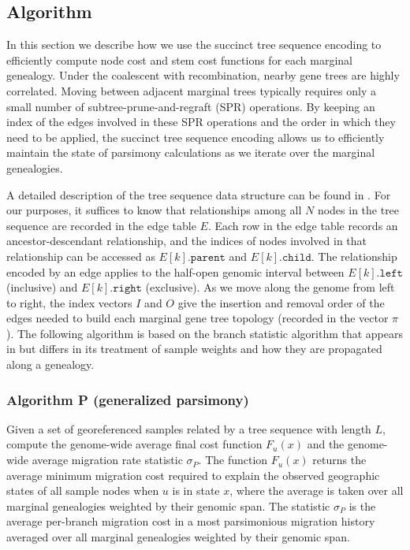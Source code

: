 
\subsection{Algorithm}

In this section we describe how we use the succinct tree sequence encoding
\citep{Kelleher_etal_2016} to efficiently compute node cost and stem cost 
functions for each marginal genealogy. Under the coalescent with recombination, 
nearby gene trees are highly correlated. Moving between adjacent marginal trees 
typically requires only a small number of subtree-prune-and-regraft (SPR) 
operations. By keeping an index of the edges involved in these SPR operations 
and the order in which they need to be applied, the succinct tree sequence 
encoding allows us to efficiently maintain the state of parsimony calculations 
as we iterate over the marginal genealogies.

A detailed description of the tree sequence data structure can be found in
\citet{Kelleher_etal_2016}. For our purposes, it suffices to know that
relationships among all $N$ nodes in the tree sequence are recorded in the edge 
table $E$. Each row in the edge table records an ancestor-descendant
relationship, and the indices of nodes involved in that relationship can be 
accessed as $E[k].\texttt{parent}$ and  $E[k].\texttt{child}$. The relationship 
encoded by an edge applies to the half-open genomic interval between $E[k].\texttt{left}$ 
(inclusive) and $E[k].\texttt{right}$ (exclusive). As we move along the genome 
from left to right, the index vectors $I$ and $O$ give the insertion and
removal order of the edges needed to build each marginal gene tree topology 
(recorded in the vector $\pi$). The following algorithm is based on
the branch statistic algorithm that appears in \citet{Ralph_etal_2020} but
differs in its treatment of sample weights and how they are propagated along
a genealogy.

\subsubsection*{Algorithm P (generalized parsimony)}

Given a set of georeferenced samples related by a tree sequence with length
$L$, compute the genome-wide average final cost function $F_u(x)$ and the
genome-wide average migration rate statistic $\sigma_P$. The function $F_u(x)$ 
returns the average minimum migration cost required to explain the observed 
geographic states of all sample nodes when $u$ is in state $x$, where the 
average is taken over all marginal genealogies weighted by their genomic span. 
The statistic $\sigma_P$ is the average per-branch migration cost in a most
parsimonious migration history averaged over all marginal genealogies weighted 
by their genomic span.

